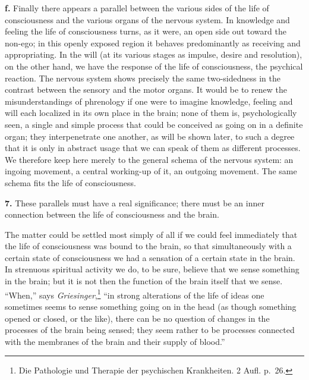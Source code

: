 \documentclass[12pt,a4paper]{book}
\newcommand{\opage}[1]{\marginnote{\footnotesize\textit{[#1]}}}
\begin{document}
\textbf{f.} Finally there appears a parallel between the various sides
of the life of consciousness and the various organs of the nervous
system. In knowledge and feeling the life of consciousness turns, as it
were, an open side out toward the non-ego; in this openly exposed region
it behaves predominantly as receiving and appropriating.
\opage{64}In the will (at its various stages as impulse, desire and
resolution), on the other hand, we have the response of the life of
consciousness, the psychical reaction. The nervous system shows
precisely the same two-sidedness in the contrast between the sensory and
the motor organs. It would be to renew the misunderstandings of
phrenology if one were to imagine knowledge, feeling and will each
localized in its own place in the brain; none of them is,
psychologically seen, a single and simple process that could be
conceived as going on in a definite organ; they interpenetrate one
another, as will be shown later, to such a degree that it is only in
abstract usage that we can speak of them as different processes. We
therefore keep here merely to the general schema of the nervous system:
an ingoing movement, a central working-up of it, an outgoing movement.
The same schema fits the life of consciousness.

\textbf{7.} These parallels must have a real significance; there must be
an inner connection between the life of consciousness and the brain.

The matter could be settled most simply of all if we could feel
immediately that the life of consciousness was bound to the brain, so
that simultaneously with a certain state of consciousness we had a
sensation of a certain state in the brain. In strenuous spiritual
activity we do, to be sure, believe that we sense something in the
brain; but it is not then the function of the brain itself that we
sense. ``When,'' says
\emph{Griesinger},\footnote{Die Pathologie und Therapie der psychischen
Krankheiten. 2 Aufl. p.~26.} ``in strong alterations of the life of
ideas one sometimes seems to sense something going on in the head (as
though something opened or closed, or the like), there can be no
question of changes in the processes of the brain being sensed; they
seem rather to be processes connected with the membranes of the brain
and their supply of blood.''
\end{document}
